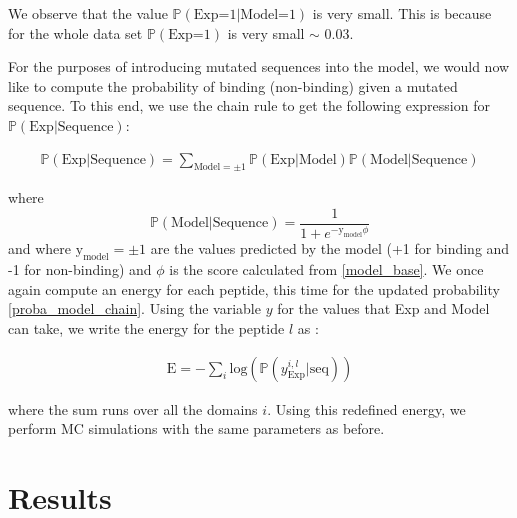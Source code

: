 \documentclass[a4paper, 12pt]{article}
\begin{document}
We observe that the value $\mathbb{P}(\text{Exp=1|Model=1})$ is very small. This is because for the whole data set $\mathbb{P}(\text{Exp=1})$ is very small $\sim$ 0.03. 

For the purposes of introducing mutated sequences into the model, we would now like to compute the probability of binding (non-binding) given a mutated sequence. To this end, we use the chain rule to get the following expression for $\mathbb{P}(\text{Exp|Sequence})$:

\begin{align}
\label{proba_model_chain}
\mathbb{P}(\text{Exp|Sequence}) = \sum_{\text{Model}=\pm 1} \mathbb{P}(\text{Exp|Model}) \mathbb{P}(\text{Model|Sequence})
\end{align}

where 
\begin{equation}
\mathbb{P}(\text{Model|Sequence}) = \frac{1}{1+e^{-\textrm{y}_{\text{model}} \phi}}
\end{equation}
and where $\textrm{y}_{\text{model}} = \pm 1$ are the values predicted by the model (+1 for binding and -1 for non-binding) and $\phi$  is the score calculated from \eqref{model_base}. We once again compute an energy for each peptide, this time for the updated probability \eqref{proba_model_chain}. Using the variable $y$ for the values that Exp and Model can take, we write the energy for the peptide $l$ as :

\begin{align} 
\label{energy_bayes}
\mathrm{E} = - \sum_{i} \mathrm{log}(\mathbb{P}(y^{i,l}_{\text{Exp}} | \text{seq}))
\end{align}

where the sum runs over all the domains $i$. Using this redefined energy, we perform MC simulations with the same parameters as before.

\section{Results}
\end{document}
